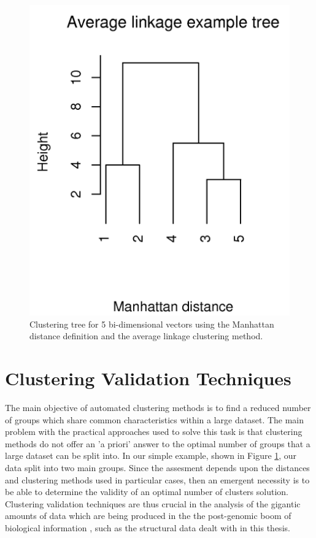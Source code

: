 \begin{figure}[t]
\centering
\includegraphics[scale=0.3]{Appendix/appendixtree.png}
\caption{Clustering  tree  for   5  bi-dimensional  vectors  using  the
  Manhattan  distance definition  and the  average  linkage clustering
  method.}
\label{fig:tree}
\end{figure}

\section{Clustering Validation Techniques}
\label{sec:validation}
The  main objective  of  automated  clustering methods  is  to find  a
reduced number  of groups which share common  characteristics within a
large dataset. The main problem  with the practical approaches used to
solve this task is that clustering  methods do not offer an 'a priori'
answer to  the optimal number  of groups that  a large dataset  can be
split into. In our simple example, shown in Figure \ref{fig:tree}, our
data split into two main  groups.  Since the assesment depends upon
the distances and clustering methods used in particular cases, then an
emergent  necessity is  to be  able to  determine the  validity  of an
optimal number of clusters solution.  Clustering validation techniques
are thus crucial in the analysis of the gigantic amounts of data which
are  being  produced  in  the  the  post-genomic  boom  of  biological
information \cite{handl2005},  such as the structural  data dealt with
in this thesis.

